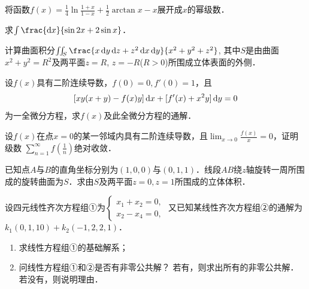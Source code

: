 \documentclass[plain,noanswer,medmath]{../../template/jnuexam}
\begin{document}
\begin{problem}
将函数$f(x) = \frac{1}{4}\ln \frac{1 + x}{1 - x} + \frac{1}{2}\arctan x - x$展开成$x$的幂级数．
\end{problem}


\begin{problem}
求$\int \frac{\dx}{\sin 2x + 2\sin x}$．
\end{problem}



\begin{problem}
计算曲面积分$\iint_S \frac{x\dy\dz + z^2 \dx\dy}{x^2 + y^2 + z^2}$,
其中$S$是由曲面$x^2 + y^2 = R^2$及两平面$z = R$, $z = - R$($R > 0$)所围成立体表面的外侧．
\end{problem}



\begin{problem}
设$f(x)$具有二阶连续导数，$f(0) = 0,f'(0) = 1$，且
$$[xy(x + y) - f(x)y]\mathop{}\!\mathrm{d} x + [f'(x) + x^2 y]\mathop{}\!\mathrm{d} y = 0$$
为一全微分方程，求$f(x)$及此全微分方程的通解．
\end{problem}



\begin{problem}
设$f(x)$在点$x = 0$的某一邻域内具有二阶连续导数，且$\lim_{x \to 0} \frac{f(x)}{x} = 0$，证明级数
$\sum_{n = 1}^{\infty}f\left(\frac{1}{n} \right)$绝对收敛．
\end{problem}



\begin{problem}
已知点$A$与$B$的直角坐标分别为$(1,0,0)$与$(0,1,1)$．线段$AB$绕$z$轴旋转一周所围成的旋转曲面为$S$．求由$S$及两平面$z = 0,z = 1$所围成的立体体积．
\end{problem}



\begin{problem}
设四元线性齐次方程组①为$\begin{cases}
  x_1 + x_2 = 0, \\
  x_2 - x_4 = 0,
\end{cases}$ 又已知某线性齐次方程组②的通解为
$k_1(0,1,10) + k_2(- 1,2,2,1)$．
\begin{enumerate}
\item 求线性方程组①的基础解系；
\item 问线性方程组①和②是否有非零公共解？
    若有，则求出所有的非零公共解．若没有，则说明理由．
\end{enumerate}
\end{problem}
\end{document}
